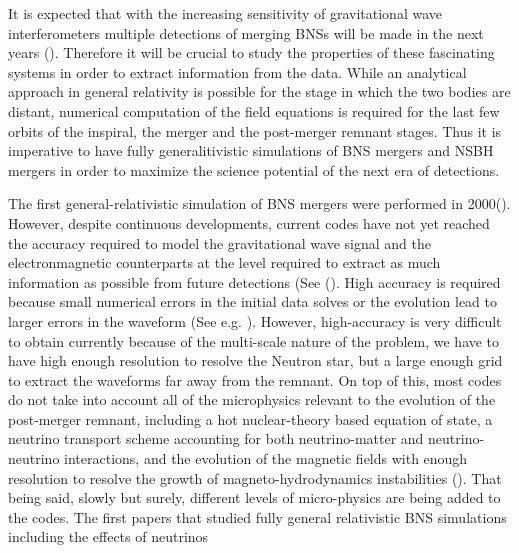 It is expected that with the increasing sensitivity of gravitational wave
interferometers multiple detections of merging BNSs will be made in the next years (\cite{ligo2018gwtc}). Therefore it will be crucial
to study the properties of these fascinating systems in order to extract information
from the data. While an analytical approach in general relativity is possible for the stage in which the two
bodies are distant, numerical computation of the field equations is required
for the last few orbits of the inspiral, the merger and the post-merger remnant stages. Thus it is imperative to have fully generalitivistic simulations of BNS mergers and NSBH mergers in order to maximize the science potential of the next era of detections.

The first general-relativistic simulation of BNS mergers were performed in 2000(\cite{shibata2000simulation}). However, despite continuous developments, current codes have not yet reached the accuracy required to model the gravitational wave signal and the electronmagnetic counterparts at the level required to extract as much information as possible from future detections (See (\cite{baiotti2016binary}). High accuracy is required because small numerical errors in the initial data solves or the evolution lead to larger errors in the waveform (See e.g. \cite{tsokaros2016initialfixed}). However, high-accuracy is very difficult to obtain currently because of the multi-scale nature of the problem, we have to have high enough resolution to resolve the Neutron star, but a large enough grid to extract the waveforms far away from the remnant. On top of this, most codes do not take into account all of the microphysics relevant to the evolution of the post-merger remnant, including a hot nuclear-theory based equation of state, a neutrino transport scheme accounting for both neutrino-matter and neutrino-neutrino interactions, and the evolution of the magnetic fields with enough resolution to resolve the growth of magneto-hydrodynamics instabilities (\cite{foucart2015low}). That being said, slowly but surely, different levels of micro-physics are being added to the codes. The first papers that studied fully general relativistic BNS simulations including the effects of neutrinos
